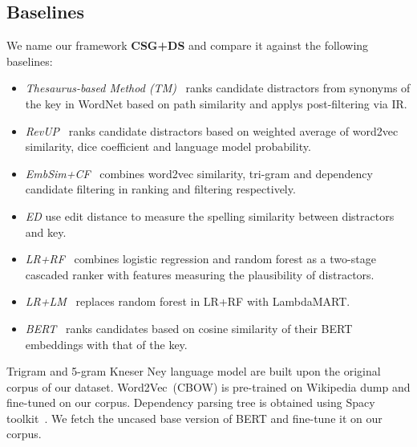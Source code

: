 \subsection{Baselines}
We name our framework \textbf{CSG+DS} and compare it against the following baselines:
\begin{itemize}
	\item \textit{Thesaurus-based Method (TM)}~\cite{sumita2005measuring} ranks candidate distractors from synonyms of the key in WordNet based on path similarity and applys post-filtering via IR.
	\item \textit{RevUP}~\cite{Kumar2015RevUP} ranks candidate distractors based on weighted average of word2vec similarity, dice coefficient and language model probability.
	\item \textit{EmbSim+CF}~\cite{jiang2017distractor} combines word2vec similarity, tri-gram and dependency candidate filtering in ranking and filtering respectively.
	\item \textit{ED} use edit distance to measure the spelling similarity between distractors and key.

	\item \textit{LR+RF}~\cite{liang2018distractor} combines logistic regression and random forest as a two-stage cascaded ranker with features measuring the plausibility of distractors.
	\item \textit{LR+LM}~\cite{liang2018distractor} replaces random forest in LR+RF with LambdaMART.
	\item \textit{BERT}~\cite{Wolf2019HuggingFacesTS} ranks candidates based on cosine similarity of their BERT embeddings with that of the key.
\end{itemize}
Trigram and 5-gram Kneser Ney language model are built upon the original corpus of our dataset. Word2Vec~(CBOW) is pre-trained on Wikipedia dump and fine-tuned on our corpus. Dependency parsing tree is obtained using Spacy toolkit~\cite{spacy2}. We fetch the uncased base version of BERT and fine-tune it on our corpus.
